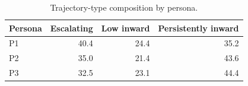 \begin{table}[t]
\centering
\small
\caption{Trajectory-type composition by persona.}
\label{tab:traj_persona}
\begin{tabular}{lrrr}
\toprule
Persona & Escalating & Low inward & Persistently inward \\
\midrule
P1 & 40.4 & 24.4 & 35.2 \\
P2 & 35.0 & 21.4 & 43.6 \\
P3 & 32.5 & 23.1 & 44.4 \\
\bottomrule
\end{tabular}
\end{table}
